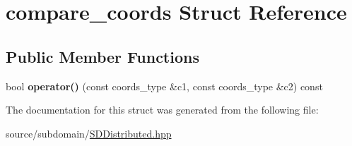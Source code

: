 \hypertarget{structcompare__coords}{}\section{compare\+\_\+coords Struct Reference}
\label{structcompare__coords}
\subsection*{Public Member Functions}
\begin{DoxyCompactItemize}
\item 
\mbox{\label{structcompare__coords_ab03ab1c46c467d5a08acd7ff2bd79de7}} 
bool {\bfseries operator()} (const coords\+\_\+type \&c1, const coords\+\_\+type \&c2) const
\end{DoxyCompactItemize}


The documentation for this struct was generated from the following file\+:\begin{DoxyCompactItemize}
\item 
source/subdomain/\hyperlink{source_2subdomain_2SDDistributed_8hpp}{S\+D\+Distributed.\+hpp}\end{DoxyCompactItemize}
